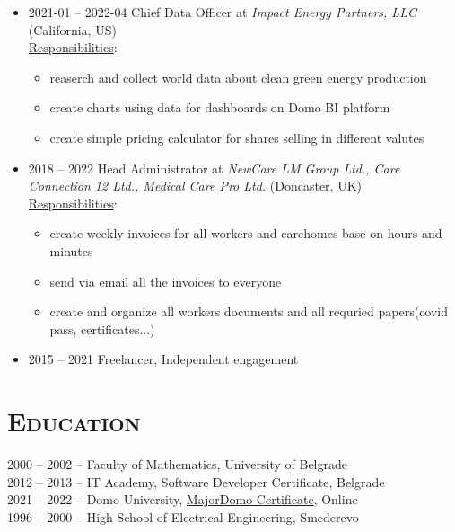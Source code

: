 \documentclass[12pt]{article}
\begin{document}
\begin{itemize}
\pagebreak

    \item  2021-01 -- 2022-04 Chief Data Officer at \textit{Impact Energy Partners, LLC} (California, US) \\
        \underline{Responsibilities}:
        \begin{itemize}
            \setlength\itemsep{0em}
            \item reaserch and collect world data about clean green energy production
            \item create charts using data for dashboards on Domo BI platform
            \item create simple pricing calculator for shares selling in different valutes
        \end{itemize}
    \item  2018    -- 2022    Head Administrator at \textit{NewCare LM Group Ltd., Care Connection 12 Ltd., Medical Care Pro Ltd.} (Doncaster, UK) \\
        \underline{Responsibilities}:
        \begin{itemize}
            \setlength\itemsep{0em}
            \item create weekly invoices for all workers and carehomes base on hours and minutes
            \item send via email all the invoices to everyone
            \item create and organize all workers documents and all requried papers(covid pass, certificates...) 
        \end{itemize}
    \item  2015    -- 2021 Freelancer, Independent engagement    
\end{itemize}

\section{\textsc{Education}}

    2000 -- 2002 -- Faculty of Mathematics, University of Belgrade \\
    2012 -- 2013 -- IT Academy, Software Developer Certificate, Belgrade \\
    2021 -- 2022 -- Domo University, \href{https://drive.google.com/file/d/1i-GzyE43WospitxXdFWp2bRYe6wqZG48/view?usp=sharing}{MajorDomo Certificate}, Online \\
    1996 -- 2000 -- High School of Electrical Engineering, Smederevo
\end{document}
